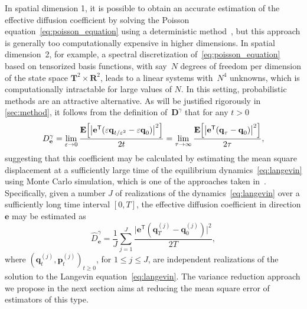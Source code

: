 \documentclass[11pt,a4paper]{article}
\newcommand{\expect}[0]{\mathbf{E}}
\newcommand{\real}{\mathbf R}
\newcommand{\torus}{\mathbf T}
\newcommand{\vect}[1]{\boldsymbol{\mathbf #1}}
\newcommand{\mat}[1]{\vect #1}
\renewcommand{\t}{\mathsf T}
\theoremstyle{plain}
\numberwithin{equation}{section}
\renewcommand{\leq}{\leqslant}
\renewcommand{\geq}{\geqslant}
\begin{document}
In spatial dimension 1,
it is possible to obtain an accurate estimation of the effective diffusion coefficient by solving the Poisson equation~\eqref{eq:poisson_equation} using a deterministic method~\cite{roussel2018spectral},
but this approach is generally too computationally expensive in higher dimensions.
In spatial dimension~2, for example,
a spectral discretization of~\eqref{eq:poisson_equation} based on tensorized basis functions,
with say~$N$ degrees of freedom per dimension of the state space $\torus^2 \times \real^2$, leads to a linear systems with~$N^4$ unknowns,
which is computationally intractable for large values of $N$.
In this setting, probabilistic methods are an attractive alternative.
As will be justified rigorously in \cref{sec:method},
it follows from the definition of~$\mat D^{\gamma}$ that
for any $t > 0$%
\begin{equation}
    \label{eq:einsteins_formula}
    D^{\gamma}_{\vect e}
    =\lim_{\varepsilon \to 0} \frac{\expect\Bigl[\bigl\lvert \vect e^\t (\varepsilon \vect q_{t/\varepsilon^2} - \varepsilon \vect q_0) \bigr\rvert^2\Bigr]}{2 t}
    =\lim_{\tau \to \infty} \frac{\expect \Bigl[\bigl\lvert \vect e^\t (\vect q_\tau - \vect q_0) \bigr\rvert^2\Bigr]}{2\tau},
\end{equation}
suggesting that this coefficient may be calculated by
estimating the mean square displacement at a sufficiently large time of the equilibrium dynamics~\eqref{eq:langevin}
using Monte Carlo simulation,
which is one of the approaches taken in~\cite{MR2427108}.
Specifically, given a number $J$ of realizations of the dynamics~\eqref{eq:langevin} over a sufficiently long time interval $[0, T]$,
the effective diffusion coefficient in direction $\vect e$ may be estimated as
\begin{equation}
    \label{eq:naive_estimator}
    \widehat D^{\gamma}_{\vect e}
    = \frac{1}{J} \sum_{j=1}^{J} \frac{\bigl\lvert \vect e^\t (\vect q^{(j)}_T - \vect q^{(j)}_0) \bigr\rvert^2}{2T},
\end{equation}
where $(\vect q_t^{(j)}, \vect p_t^{(j)})_{t \geq 0}$, for $1 \leq j \leq J$,
are independent realizations of the solution to the Langevin equation~\eqref{eq:langevin}.
The variance reduction approach we propose in the next section aims at reducing the mean square error of estimators of this type.
\end{document}
